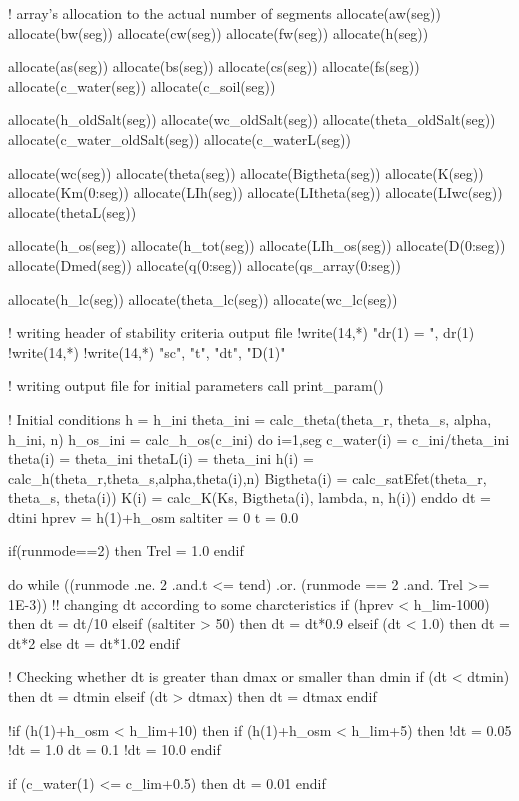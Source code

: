 ! array's allocation to the actual number of segments
allocate(aw(seg))
allocate(bw(seg))
allocate(cw(seg))
allocate(fw(seg))
allocate(h(seg))

allocate(as(seg))
allocate(bs(seg))
allocate(cs(seg))
allocate(fs(seg))
allocate(c_water(seg))
allocate(c_soil(seg))

allocate(h_oldSalt(seg))
allocate(wc_oldSalt(seg))
allocate(theta_oldSalt(seg))
allocate(c_water_oldSalt(seg))
allocate(c_waterL(seg))

allocate(wc(seg))
allocate(theta(seg))
allocate(Bigtheta(seg))
allocate(K(seg))
allocate(Km(0:seg))
allocate(LIh(seg))
allocate(LItheta(seg))
allocate(LIwc(seg))
allocate(thetaL(seg))

allocate(h_os(seg))
allocate(h_tot(seg))
allocate(LIh_os(seg))
allocate(D(0:seg))
allocate(Dmed(seg))
allocate(q(0:seg))
allocate(qs_array(0:seg))

allocate(h_lc(seg))
allocate(theta_lc(seg))
allocate(wc_lc(seg))

! writing header of stability criteria output file
!write(14,*) "dr(1) = ", dr(1)
!write(14,*)
!write(14,*) "sc", "t", "dt", "D(1)"

! writing output file for initial parameters
call print_param()

! Initial conditions
h = h_ini
theta_ini = calc_theta(theta_r, theta_s, alpha, h_ini, n)
h_os_ini = calc_h_os(c_ini)
do i=1,seg
  c_water(i) = c_ini/theta_ini
  theta(i) = theta_ini
  thetaL(i) = theta_ini
  h(i) = calc_h(theta_r,theta_s,alpha,theta(i),n)
  Bigtheta(i) = calc_satEfet(theta_r, theta_s, theta(i))
  K(i) = calc_K(Ks, Bigtheta(i), lambda, n, h(i))
enddo
dt = dtini
hprev = h(1)+h_osm
saltiter = 0
t = 0.0

if(runmode==2) then
  Trel = 1.0
endif

do while ((runmode .ne. 2 .and.t <= tend) .or. (runmode == 2 .and. Trel >= 1E-3))
  !! changing dt according to some charcteristics
  if (hprev < h_lim-1000) then
    dt = dt/10
  elseif (saltiter > 50) then
    dt = dt*0.9
  elseif (dt < 1.0) then
    dt = dt*2
  else
    dt = dt*1.02
  endif
  
  ! Checking whether dt is greater than dmax or smaller than dmin
  if (dt < dtmin) then
    dt = dtmin
  elseif (dt > dtmax) then
    dt = dtmax
  endif

  !if (h(1)+h_osm < h_lim+10) then
  if (h(1)+h_osm < h_lim+5) then
    !dt = 0.05
    !dt = 1.0
    dt = 0.1
    !dt = 10.0
  endif

  if (c_water(1) <= c_lim+0.5) then
    dt = 0.01
  endif

